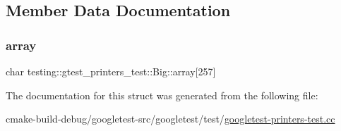 \subsection{Member Data Documentation}
\mbox{\label{structtesting_1_1gtest__printers__test_1_1Big_a863911a8ec5c3bbe79c44d399f1de61f}} 
\subsubsection{\texorpdfstring{array}{array}}
{\footnotesize\ttfamily char testing\+::gtest\+\_\+printers\+\_\+test\+::\+Big\+::array\mbox{[}257\mbox{]}}



The documentation for this struct was generated from the following file\+:\begin{DoxyCompactItemize}
\item 
cmake-\/build-\/debug/googletest-\/src/googletest/test/\mbox{\hyperlink{googletest-printers-test_8cc}{googletest-\/printers-\/test.\+cc}}\end{DoxyCompactItemize}
